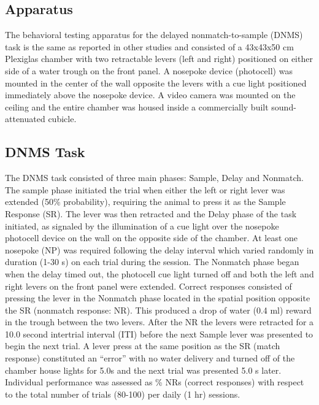 \documentclass[11pt,a4paper,final]{article}
\begin{document}
    \subsection{Apparatus}
The behavioral testing apparatus for the delayed nonmatch-to-sample (DNMS) task is the same as reported in other studies \citep{hampson00} and consisted of a 43x43x50 cm Plexiglas chamber with two retractable levers (left and right) positioned on either side of a water trough on the front panel.
A nosepoke device (photocell) was mounted in the center of the wall opposite the levers with a cue light positioned immediately above the nosepoke device.
A video camera was mounted on the ceiling and the entire chamber was housed inside a commercially built sound-attenuated cubicle.

    \subsection{DNMS Task}
The DNMS task consisted of three main phases: Sample, Delay and Nonmatch.
The sample phase initiated the trial when either the left or right lever was extended (50\% probability), requiring the animal to press it as the Sample Response (SR).
The lever was then retracted and the Delay phase of the task initiated, as signaled by the illumination of a cue light over the nosepoke photocell device on the wall on the opposite side of the chamber.
At least one nosepoke (NP) was required following the delay interval which varied randomly in duration (1-30 s) on each trial during the session.
The Nonmatch phase began when the delay timed out, the photocell cue light turned off and both the left and right levers on the front panel were extended. Correct responses consisted of pressing the lever in the Nonmatch phase located in the spatial position opposite the SR (nonmatch response: NR). This produced a drop of water (0.4 ml) reward in the trough between the two levers.
After the NR the levers were retracted for a 10.0 second intertrial interval (ITI) before the next Sample lever was presented to begin the next trial.
A lever press at the same position as the SR (match response) constituted an “error” with no water delivery and turned off of the chamber house lights for 5.0s and the next trial was presented 5.0 s later.
Individual performance was assessed as \% NRs (correct responses) with respect to the total number of trials (80-100) per daily (1 hr) sessions.
\end{document}
